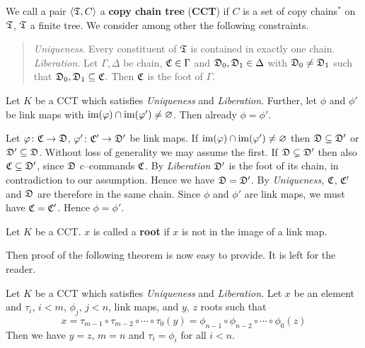 We call a pair $\langle \mathfrak{T}, C\rangle$ a \textbf{copy chain tree}
(\textbf{CCT}) if $C$ is a set of copy chains$^{\ast}$ on $\mathfrak{T}$,
$\mathfrak{T}$ a finite tree. We consider among other the following
constraints.
\begin{quote}
{\sl Uniqueness}.
Every constituent of $\mathfrak{T}$ is contained in exactly one chain.
\\
{\sl Liberation}. Let $\Gamma, \Delta$ be chain, $\mathfrak{C} \in \Gamma$
    and $\mathfrak{D}_0, \mathfrak{D}_1 \in \Delta$ with $\mathfrak{D}_0 \neq \mathfrak{D}_1$ such
    that $\mathfrak{D}_0, \mathfrak{D}_1 \subseteq \mathfrak{C}$. Then $\mathfrak{C}$ is the foot
    of $\Gamma$.
\end{quote}
\begin{lem}
Let $K$ be a CCT which satisfies {\sl Uniqueness} and
{\sl Liberation}. Further, let $\phi$ and $\phi'$ be link maps with
$\operatorname{im}(\varphi) \cap \operatorname{im}(\varphi') \neq \varnothing$. Then already 
$\phi = \phi'$.
\end{lem}
\proofbeg
Let $\varphi \colon \mathfrak{C} \rightarrow \mathfrak{D}$, $\varphi' \colon \mathfrak{C}' \rightarrow \mathfrak{D}'$ be link 
maps.  If $\operatorname{im}(\varphi) \cap \operatorname{im}(\varphi') \neq \varnothing$ then 
$\mathfrak{D} \subseteq \mathfrak{D}'$ or $\mathfrak{D}' \subseteq \mathfrak{D}$. Without loss of 
generality we may assume the first. If $\mathfrak{D} \subsetneq \mathfrak{D}'$ then 
also $\mathfrak{C} \subseteq \mathfrak{D}'$, since $\mathfrak{D}$ c--commands $\mathfrak{C}$. By 
{\sl Liberation\/} $\mathfrak{D}'$ is the foot of its chain, in contradiction 
to our assumption. Hence we have $\mathfrak{D} = \mathfrak{D}'$. By {\sl Uniqueness}, 
$\mathfrak{C}$, $\mathfrak{C}'$ and $\mathfrak{D}$ are therefore in the same chain. Since 
$\phi$ and $\phi'$ are link maps, we must have $\mathfrak{C} = \mathfrak{C}'$. 
Hence $\phi = \phi'$.
\proofend
\begin{defn}
Let $K$ be a CCT. $x$ is called a \textbf{root} if $x$ is not in the
image of a link map.
\end{defn}
Then proof of the following theorem is now easy to provide.
It is left for the reader.
\begin{prop}
\label{prop:kandek}
Let $K$ be a CCT which satisfies {\sl Uniqueness} and {\sl Liberation}.
Let $x$ be an element and $\tau_i$, $i < m$, $\phi_j$, $j < n$,
link maps, and $y$, $z$ roots such that
\begin{equation}
x = \tau_{m-1} \circ \tau_{m-2} \circ \dotsb \circ \tau_0(y) =
    \phi_{n-1} \circ \phi_{n-2} \circ \dotsb \circ \phi_0(z) 
\end{equation}
Then we have $y = z$, $m = n$ and $\tau_i = \phi_i$ for all
$i < n$.
\end{prop}
